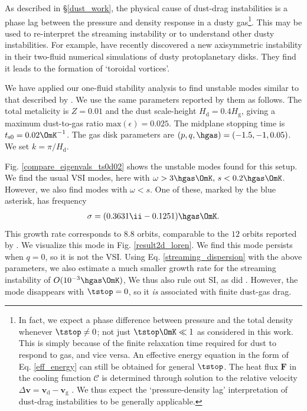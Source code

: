 As described in \S\ref{dust_work}, 
the physical cause of dust-drag instabilities is a phase lag between
the pressure and density response in a dusty gas\footnote{
In fact, we expect a phase difference between pressure and the total
density  whenever $\tstop\neq0$; not just $\tstop\OmK\ll 1$ as 
considered in this work. This is simply because of the finite
relaxation time required for dust to respond to gas, and vice versa. 
An effective energy equation in the form of Eq. \ref{eff_energy} can
still be obtained for general $\tstop$. The
heat flux $\bm{F}$ in the cooling function $\mathcal{C}$ is determined
through solution to the relative velocity $\Delta \bm{v} =
\bm{v}_\mathrm{d}-\bm{v}_\mathrm{g}$ \citep{youdin05a,laibe14}.  We
thus expect the `pressure-density lag' interpretation of dust-drag 
instabilities to be generally applicable.}. 
This may be used to re-interpret the streaming instability or to
understand other dusty instabilities. For example,
\cite{loren15,loren16} have recently discovered a new axisymmetric 
instability in their two-fluid numerical simulations of dusty
protoplanetary disks. They find it leads to the formation of
`toroidal vortices'. 

We have applied our one-fluid stability analysis to find unstable modes  
similar to that described by \cite{loren15}. We use the same
parameters reported by them as follows. 
The total metalicity is $Z=0.01$ and the dust scale-height $H_\mathrm{d} =
0.4H_\mathrm{g}$, giving a maximum dust-to-gas ratio
$\mathrm{max}(\epsilon) = 0.025$. The midplane stopping time is 
$t_\mathrm{s0}=0.02\OmK^{-1}$. The gas disk parameters are $(p,q,
\hgas) =(-1.5, -1,0.05)$.  We set $k = \pi/H_\mathrm{d}$.      

Fig. \ref{compare_eigenvals_ts0d02} shows the unstable modes found for
this setup. We find the usual VSI modes, here with $\omega> 3\hgas\OmK,\, s<
0.2\hgas\OmK$. However, we also find modes with $\omega<s$. One of these,
marked by the blue asterisk, has 
frequency 
\begin{align*}
\sigma = (0.3631\ii - 0.1251)\hgas\OmK. 
\end{align*}
This growth rate corresponds to $8.8$ orbits, comparable to the $12$
orbits reported by \citeauthor{loren15}. We visualize this mode in
Fig. \ref{result2d_loren}. We find this mode 
persists when $q=0$, so it is not the VSI. 
Using Eq. \ref{streaming_dispersion} with the above parameters,  
we also estimate a much smaller growth 
rate for the streaming instability of 
$O(10^{-3}\hgas\OmK)$, We thus also rule out
SI, as did \citeauthor{loren15}. However, the mode disappears with $\tstop=0$, so it \emph{is}
associated with finite dust-gas drag. 

